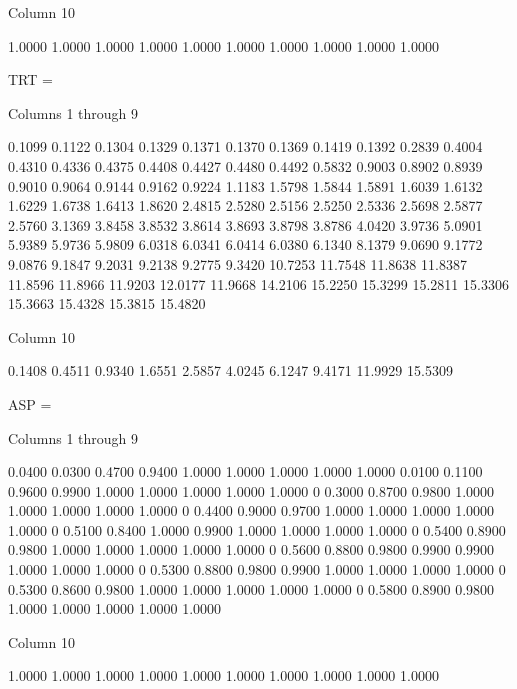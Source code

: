   Column 10

    1.0000
    1.0000
    1.0000
    1.0000
    1.0000
    1.0000
    1.0000
    1.0000
    1.0000
    1.0000


TRT =

  Columns 1 through 9

    0.1099    0.1122    0.1304    0.1329    0.1371    0.1370    0.1369    0.1419    0.1392
    0.2839    0.4004    0.4310    0.4336    0.4375    0.4408    0.4427    0.4480    0.4492
    0.5832    0.9003    0.8902    0.8939    0.9010    0.9064    0.9144    0.9162    0.9224
    1.1183    1.5798    1.5844    1.5891    1.6039    1.6132    1.6229    1.6738    1.6413
    1.8620    2.4815    2.5280    2.5156    2.5250    2.5336    2.5698    2.5877    2.5760
    3.1369    3.8458    3.8532    3.8614    3.8693    3.8798    3.8786    4.0420    3.9736
    5.0901    5.9389    5.9736    5.9809    6.0318    6.0341    6.0414    6.0380    6.1340
    8.1379    9.0690    9.1772    9.0876    9.1847    9.2031    9.2138    9.2775    9.3420
   10.7253   11.7548   11.8638   11.8387   11.8596   11.8966   11.9203   12.0177   11.9668
   14.2106   15.2250   15.3299   15.2811   15.3306   15.3663   15.4328   15.3815   15.4820

  Column 10

    0.1408
    0.4511
    0.9340
    1.6551
    2.5857
    4.0245
    6.1247
    9.4171
   11.9929
   15.5309


ASP =

  Columns 1 through 9

    0.0400    0.0300    0.4700    0.9400    1.0000    1.0000    1.0000    1.0000    1.0000
    0.0100    0.1100    0.9600    0.9900    1.0000    1.0000    1.0000    1.0000    1.0000
         0    0.3000    0.8700    0.9800    1.0000    1.0000    1.0000    1.0000    1.0000
         0    0.4400    0.9000    0.9700    1.0000    1.0000    1.0000    1.0000    1.0000
         0    0.5100    0.8400    1.0000    0.9900    1.0000    1.0000    1.0000    1.0000
         0    0.5400    0.8900    0.9800    1.0000    1.0000    1.0000    1.0000    1.0000
         0    0.5600    0.8800    0.9800    0.9900    0.9900    1.0000    1.0000    1.0000
         0    0.5300    0.8800    0.9800    0.9900    1.0000    1.0000    1.0000    1.0000
         0    0.5300    0.8600    0.9800    1.0000    1.0000    1.0000    1.0000    1.0000
         0    0.5800    0.8900    0.9800    1.0000    1.0000    1.0000    1.0000    1.0000

  Column 10

    1.0000
    1.0000
    1.0000
    1.0000
    1.0000
    1.0000
    1.0000
    1.0000
    1.0000
    1.0000


